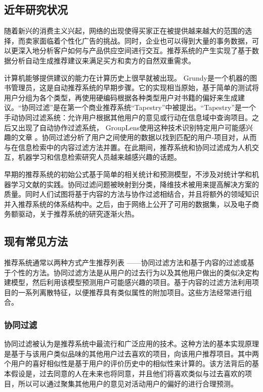 \subsection{近年研究状况}
随着新兴的消费主义兴起，网络的出现使得买家正在被提供越来越大的范围的选择，而卖家面临着个性化广告的挑战。同时，企业也可以得到大量的事务数据，可以更深入地分析客户如何与产品供应空间进行交互。推荐系统的产生实现了基于数据分析自动生成推荐建议来满足买方和卖方的自然双重需求。

计算机能够提供建议的能力在计算历史上很早就被出现。 Grundy是一个机器的图书管理员，这是自动推荐系统的早期步骤。它的实现相当原始，基于简单的测试将用户分组为各个类型，再使用硬编码根据各种类型用户对书籍的偏好来生成建议。“协同过滤”是在第一个商业推荐系统“Tapestry”中被提出。“Tapestry”是一个手动协同过滤系统：允许用户根据其他用户的意见或行动在信息域中查询项目。之后又出现了自动协作过滤系统， GroupLens使用这种技术识别特定用户可能感兴趣的文章 。协同过滤分析了用户之间使用的数据以找到匹配的用户-项目对，从而与在信息检索中的内容过滤方法并置。在此期间，推荐系统和协同过滤成为人机交互，机器学习和信息检索研究人员越来越感兴趣的话题。

早期的推荐系统的初始公式基于简单的相关统计和预测模型，不涉及对统计学和机器学习文献的实践。协同过滤问题被映射到分类，降维技术被用来提高解决方案的质量。同时人们试图将基于内容的方法与协作过滤相结合，并且将额外的领域知识并入推荐系统的体系结构中。之后，由于网络上公开了可用的数据集，以及电子商务额驱动，关于推荐系统的研究逐渐火热。
\subsection{现有常见方法}
推荐系统通常以两种方式产生推荐列表 ——协同过滤方法和基于内容的过滤或基于个性的方法\cite{rec4}。协同过滤方法是从用户的过去行为以及其他用户做出的类似决定构建模型，然后利用该模型预测用户可能感兴趣的项目\cite{rec2}。基于内容的过滤方法利用项目的一系列离散特征，以便推荐具有类似属性的附加项目\cite{rec5}。这些方法经常进行组合。
\subsubsection{协同过滤}

协同过滤被认为是推荐系统中最流行和广泛应用的技术\cite{rec6}。这种方法的基本实现原理是基于与该用户类似品味的其他用户过去喜欢的项目，向该用户推荐项目。其中两个用户的喜好相似性是基于用户的评价历史中的相似性来计算的。该方法背后的基本假设是，过去同意的人在未来也将同意，并且他们将喜欢类似与过去喜欢的项目，所以可以通过聚集其他用户的意见对活动用户的偏好的进行合理预测\cite{rec5}。

